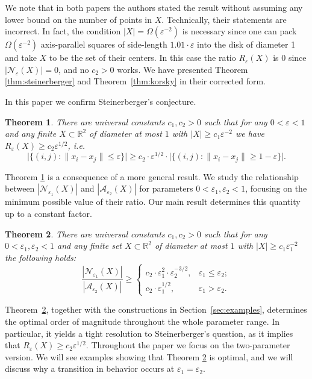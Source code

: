 \documentclass[12pt]{article}
\newtheorem{thm}{Theorem}[section]
\newcommand{\eps}{\varepsilon}
\begin{document}
We note that in both papers the authors stated the result without assuming any lower bound on the number of points in $X$. Technically, their statements are incorrect. In fact, the condition $|X|=\Omega(\varepsilon^{-2})$ is necessary since one can pack $\Omega(\varepsilon^{-2})$ axis-parallel squares of side-length $1.01\cdot\eps$ into the disk of diameter 1 and take $X$ to be the set of their centers. In this case the ratio $R_\eps(X)$ is 0 since $|\mathcal{N}_\eps(X)|=0$, and no $c_2>0$ works. We have  presented Theorem \ref{thm:steinerberger} and Theorem~\ref{thm:korsky} in their corrected form. 

In this paper we confirm Steinerberger's conjecture. 

\begin{thm}\label{thm:main_single}
There are universal constants $c_1,c_2>0$ such that for any $0<\varepsilon<1$  and  any finite $X\subset \mathbb{R}^2$ of diameter at most $1$ with $|X|\ge c_1\varepsilon^{-2}$ we have $R_\eps(X)\ge c_2\eps^{1/2}$, i.e.
    \[
\big|\{(i,j):\|x_i-x_j\|\le \eps\}\big|
\ge c_2\cdot \eps^{1/2}\cdot
\big|\{(i,j):\|x_i-x_j\|\ge 1-\eps\}\big|.
\]

\end{thm}

Theorem \ref{thm:main_single} is a consequence of a more general result. We study the relationship between $|\mathcal{N}_{\eps_1}(X)|$ and $|\mathcal{A}_{\eps_2}(X)|$ for parameters $0<\eps_1,\eps_2<1$, focusing on the minimum possible value of their ratio. Our main result determines this quantity up to a constant factor.     

\begin{thm}\label{thm:main}
There are universal constants $c_1,c_2>0$ such that for any $0<\varepsilon_1,\varepsilon_2<1$ and any finite set $X\subset \mathbb{R}^2$ of diameter at most $1$ with $|X|\ge c_1\varepsilon_1^{-2}$ the following holds: 
\[
\dfrac{|\mathcal{N}_{\eps_1}(X)|}{|\mathcal{A}_{\eps_2}(X)|} \ge
\begin{cases}
c_2\cdot \eps_1^2\cdot \eps_2^{-3/2}, & \eps_1 \le \eps_2; \\
 c_2\cdot \eps_1^{1/2}, & \eps_1 > \eps_2.
\end{cases}
\]
\end{thm}

Theorem~\ref{thm:main}, together with the constructions in Section~\ref{sec:examples}, determines the optimal order of magnitude throughout the whole parameter range. In particular, it yields a tight resolution to Steinerberger's question, as it implies that $R_\eps(X)\geq c_2\eps^{1/2}$. Throughout the paper we focus on the two-parameter version. We will see examples showing that Theorem \ref{thm:main} is optimal, and we will discuss why a transition in behavior occurs at  $\eps_1=\eps_2$.
\end{document}

